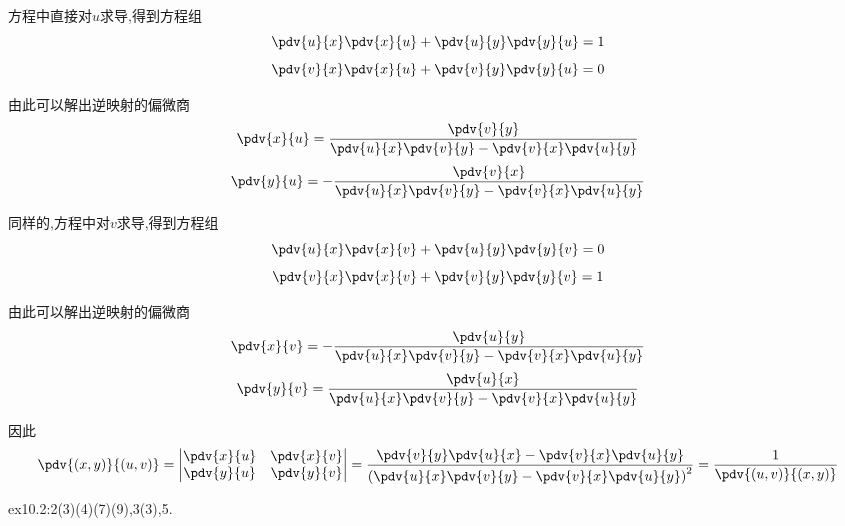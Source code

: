 方程中直接对$u$求导,得到方程组
$$\pdv{u}{x} \pdv{x}{u} + \pdv{u}{y} \pdv{y}{u} = 1$$
$$\pdv{v}{x} \pdv{x}{u} + \pdv{v}{y} \pdv{y}{u} = 0$$

由此可以解出逆映射的偏微商
$$\pdv{x}{u}= \frac{\pdv{v}{y}}{\pdv{u}{x}\pdv{v}{y} - \pdv{v}{x}\pdv{u}{y}}$$
$$\pdv{y}{u} = - \frac{\pdv{v}{x}}{\pdv{u}{x}\pdv{v}{y} - \pdv{v}{x}\pdv{u}{y}}$$

同样的,方程中对$v$求导,得到方程组
$$\pdv{u}{x} \pdv{x}{v} + \pdv{u}{y} \pdv{y}{v} = 0$$
$$\pdv{v}{x} \pdv{x}{v} + \pdv{v}{y} \pdv{y}{v} = 1$$

由此可以解出逆映射的偏微商
$$\pdv{x}{v}= - \frac{\pdv{u}{y}}{\pdv{u}{x}\pdv{v}{y} - \pdv{v}{x}\pdv{u}{y}}$$
$$\pdv{y}{v} =\frac{\pdv{u}{x}}{\pdv{u}{x}\pdv{v}{y} - \pdv{v}{x}\pdv{u}{y}}$$

因此
$$\pdv{(x,y)}{(u,v)} = \begin{vmatrix}
    \pdv{x}{u} & \pdv{x}{v}\\
    \pdv{y}{u} & \pdv{y}{v}
\end{vmatrix} = \frac{\pdv{v}{y} \pdv{u}{x} - \pdv{v}{x} \pdv{u}{y}}{\left( \pdv{u}{x}\pdv{v}{y} - \pdv{v}{x}\pdv{u}{y} \right)^2} = \frac{1}{\pdv{(u,v)}{(x,y)}}
$$

\begin{homework}
    ex10.2:2(3)(4)(7)(9),3(3),5.
\end{homework}



















